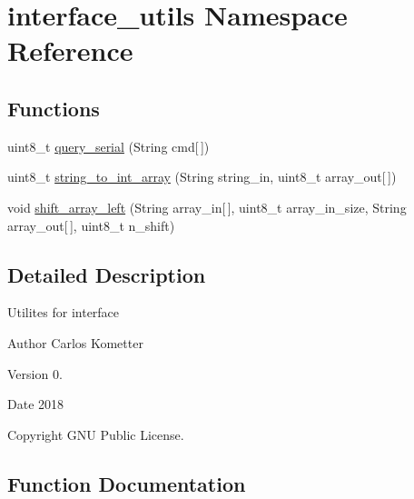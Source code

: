 \hypertarget{namespaceinterface__utils}{}\section{interface\+\_\+utils Namespace Reference}
\label{namespaceinterface__utils}
\subsection*{Functions}
\begin{DoxyCompactItemize}
\item 
uint8\+\_\+t \mbox{\hyperlink{namespaceinterface__utils_a3ba730867d788c0abb2a7b684d35f0cc}{query\+\_\+serial}} (String cmd\mbox{[}$\,$\mbox{]})
\item 
uint8\+\_\+t \mbox{\hyperlink{namespaceinterface__utils_a9c948fd33bfb82219b983e55ef78d867}{string\+\_\+to\+\_\+int\+\_\+array}} (String string\+\_\+in, uint8\+\_\+t array\+\_\+out\mbox{[}$\,$\mbox{]})
\item 
void \mbox{\hyperlink{namespaceinterface__utils_ae7b158c5f5d6597c9e38164fb88fefd3}{shift\+\_\+array\+\_\+left}} (String array\+\_\+in\mbox{[}$\,$\mbox{]}, uint8\+\_\+t array\+\_\+in\+\_\+size, String array\+\_\+out\mbox{[}$\,$\mbox{]}, uint8\+\_\+t n\+\_\+shift)
\end{DoxyCompactItemize}


\subsection{Detailed Description}
Utilites for interface \begin{DoxyAuthor}{Author}
Carlos Kometter 
\end{DoxyAuthor}
\begin{DoxyVersion}{Version}
0. 
\end{DoxyVersion}
\begin{DoxyDate}{Date}
2018 
\end{DoxyDate}
\begin{DoxyCopyright}{Copyright}
G\+NU Public License. 
\end{DoxyCopyright}


\subsection{Function Documentation}
\mbox{\label{namespaceinterface__utils_a3ba730867d788c0abb2a7b684d35f0cc}} 

